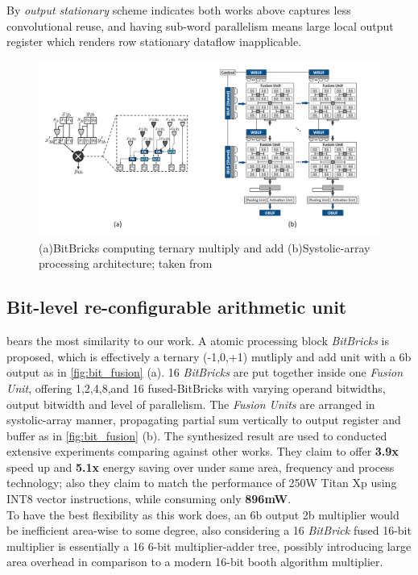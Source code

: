 By \textit{output stationary} scheme indicates both works above captures less convolutional reuse, and having sub-word parallelism means large local output register which renders row stationary dataflow inapplicable.
\begin{figure}[t]
    \centering
    \includegraphics[width=0.7\linewidth]{inc/2_related_work/figure/bit_fusion.png}
    \caption{(a)BitBricks computing ternary multiply and add (b)Systolic-array processing architecture; taken from \cite{BitFusion}}
    \label{fig:bit_fusion}
\end{figure}
\subsection{Bit-level re-configurable arithmetic unit}

\cite{BitFusion} bears the most similarity to our work. A atomic processing block \textit{BitBricks} is proposed, which is effectively a ternary (-1,0,+1) mutliply and add unit with a 6b output as in \autoref{fig:bit_fusion} (a). 16 \textit{BitBricks} are put together inside one \textit{Fusion Unit}, offering 1,2,4,8,and 16 fused-BitBricks with varying operand bitwidths, output bitwidth and level of parallelism. The \textit{Fusion Units} are arranged in systolic-array manner, propagating partial sum vertically to output register and buffer as in \autoref{fig:bit_fusion} (b). The synthesized result are used to conducted extensive experiments comparing against other works. They claim to offer \textbf{3.9x} speed up and \textbf{5.1x} energy saving over \cite{Eyeriss} under same area, frequency and process technology; also they claim to match the performance of 250W Titan Xp using INT8 vector instructions, while consuming only \textbf{896mW}. \\
To have the best flexibility as this work does, an 6b output 2b multiplier would be inefficient area-wise to some degree, also considering a 16 \textit{BitBrick} fused 16-bit multiplier is essentially a 16 6-bit multiplier-adder tree, possibly introducing large area overhead in comparison to a modern 16-bit booth algorithm multiplier.
 \\

